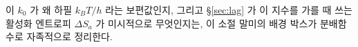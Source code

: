 
이 $k_0$ 가 왜 하필 $k_BT/h$ 라는 보편값인지, 그리고 \S\ref{sec:lag} 가 이 지수를 가를 때 쓰는
활성화 엔트로피 $\Delta S_a$ 가 미시적으로 무엇인지는, 이 소절 말미의 배경 박스가 분배함수로
자족적으로 정리한다.

